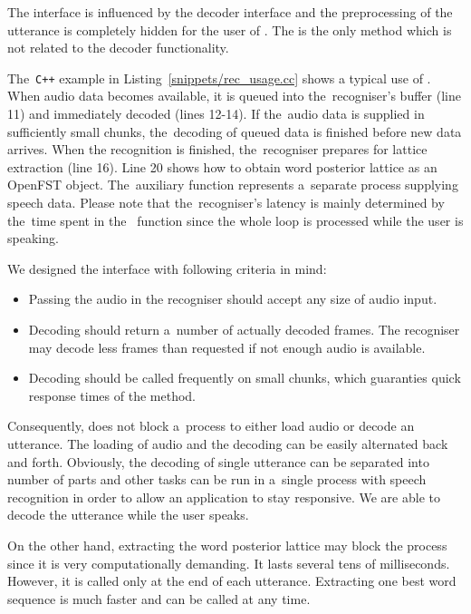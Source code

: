 The interface is influenced by the decoder interface and the preprocessing of the utterance is completely hidden for the user of .
The  is the only method which is not related to the decoder functionality. 

The~\verb!C++! example in Listing~\ref{snippets/rec_usage.cc} shows a typical use of .
When audio data becomes available, it is queued into the~recogniser's buffer (line 11) and immediately decoded (lines 12-14).
If the~audio data is supplied in sufficiently small chunks, the~decoding of queued data is finished before new data arrives.
When the recognition is finished, the~recogniser prepares for lattice extraction (line 16).
Line 20 shows how to obtain word posterior lattice as an OpenFST object.
The~auxiliary  function represents a~separate process supplying speech data.
Please note that the~recogniser's latency is mainly determined by the~time spent in the~ function since the whole loop is processed while the user is speaking.


We designed the interface with following criteria in mind:
\begin{itemize}
    \item Passing the audio in the recogniser should accept any size of audio input.
    \item Decoding should return a~number of actually decoded frames. The recogniser may decode less frames than requested if not enough audio is available.
    \item Decoding should be called frequently on small chunks, which guaranties quick response times of the  method.
\end{itemize}

Consequently,  does not block a~process to either load audio or decode an utterance.
The loading of audio and the decoding can be easily alternated back and forth.
Obviously, the decoding of single utterance can be separated into number of parts and other tasks can be run in a~single process with speech recognition in order to allow an application to stay responsive.
We are able to decode the utterance while the user speaks.

On the other hand, extracting the word posterior lattice may block the process since it is very computationally demanding.
It lasts several tens of milliseconds. 
However, it is called only at the end of each utterance.
Extracting one best word sequence is much faster and can be called at any time.

